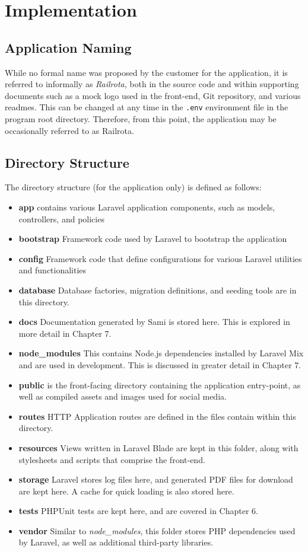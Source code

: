\chapter{Implementation}

\section{Application Naming}
While no formal name was proposed by the customer for the application, it is referred to informally as \textit{Railrota}, both in the source code and within supporting documents such as a mock logo used in the front-end, Git repository, and various readmes. This can be changed at any time in the \texttt{.env} environment file in the program root directory. Therefore, from this point, the application may be occasionally referred to as Railrota.

\section{Directory Structure}
The directory structure (for the application only) is defined as follows:

\begin{itemize}
    \item \textbf{app} contains various Laravel application components, such as models, controllers, and policies
    \item \textbf{bootstrap} Framework code used by Laravel to bootstrap the application
    \item \textbf{config} Framework code that define configurations for various Laravel utilities and functionalities
    \item \textbf{database} Database factories, migration definitions, and seeding tools are in this directory.
    \item \textbf{docs} Documentation generated by Sami is stored here. This is explored in more detail in Chapter 7.
    \item \textbf{node\_modules} This contains Node.js dependencies installed by Laravel Mix and are used in development. This is discussed in greater detail in Chapter 7.
    \item \textbf{public} is the front-facing directory containing the application entry-point, as well as compiled assets and images used for social media.
    \item \textbf{routes} HTTP Application routes are defined in the files contain within this directory.
    \item \textbf{resources} Views written in Laravel Blade are kept in this folder, along with stylesheets and scripts that comprise the front-end.
    \item \textbf{storage} Laravel stores log files here, and generated PDF files for download are kept here. A cache for quick loading is also stored here.
    \item \textbf{tests} PHPUnit tests are kept here, and are covered in Chapter 6.
    \item \textbf{vendor} Similar to \textit{node\_modules}, this folder stores PHP dependencies used by Laravel, as well as additional third-party libraries.
\end{itemize} \cite{W3Schools1}

